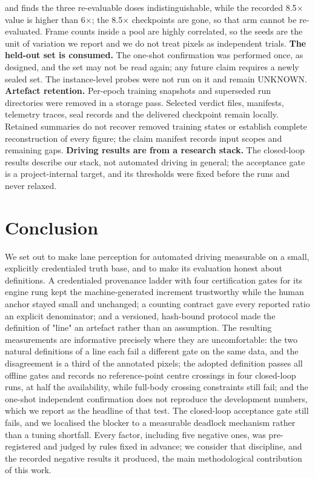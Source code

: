 \documentclass[journal]{IEEEtran}
\begin{document}
and finds the three re-evaluable doses indistinguishable, while the recorded 8.5$\times$ value is higher than
6$\times$; the 8.5$\times$ checkpoints are gone, so that arm cannot be re-evaluated. Frame counts inside a pool are
highly correlated, so the seeds are the unit of variation we report and we do not treat pixels as independent
trials.
\textbf{The held-out set is consumed.} The one-shot confirmation was performed once, as designed, and the
set may not be read again; any future claim requires a newly sealed set. The instance-level probes
were not run on it and remain UNKNOWN.
\textbf{Artefact retention.} Per-epoch training snapshots and superseded run directories were removed in a
storage pass. Selected verdict files, manifests, telemetry traces, seal records and the delivered
checkpoint remain locally. Retained summaries do not recover removed training states or establish
complete reconstruction of every figure; the claim manifest records input scopes and remaining gaps.
\textbf{Driving results are from a research stack.} The closed-loop results describe our stack, not
automated driving in general; the acceptance gate is a project-internal target, and its thresholds
were fixed before the runs and never relaxed.
\section{Conclusion}
We set out to make lane perception for automated driving measurable on a small, explicitly credentialed truth base,
and to make its evaluation honest about definitions. A credentialed provenance ladder with four certification gates for its engine rung kept the machine-generated increment
trustworthy while the human anchor stayed small and unchanged; a counting contract gave every reported ratio an
explicit denominator; and a versioned, hash-bound protocol made the definition of "line" an artefact
rather than an assumption. The resulting measurements are informative precisely where they are
uncomfortable: the two natural definitions of a line each fail a different gate on the same data, and
the disagreement is a third of the annotated pixels; the adopted definition passes all offline gates
and records no reference-point centre crossings in four closed-loop runs, at half the availability,
while full-body crossing constraints still fail; and the one-shot
independent confirmation does not reproduce the development numbers, which we report as the headline
of that test. The closed-loop acceptance gate still fails, and we localised the blocker to a
measurable deadlock mechanism rather than a tuning shortfall. Every factor, including five negative
ones, was pre-registered and judged by rules fixed in advance; we consider that discipline, and the
recorded negative results it produced, the main methodological contribution of this work.
\end{document}
